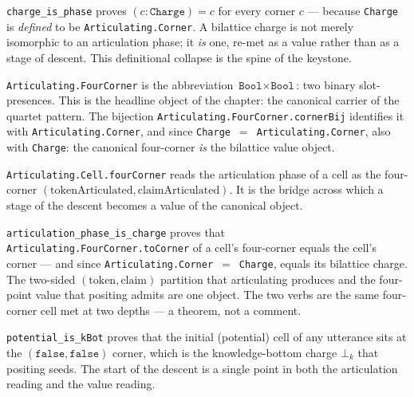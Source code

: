 \begin{theorem}\label{thm:charge-is-phase}\leanok{}
\texttt{charge\_is\_phase} proves $(c : \texttt{Charge}) = c$ for every corner $c$ --- because \texttt{Charge} is \emph{defined} to be \texttt{Articulating.Corner}. A bilattice charge is not merely isomorphic to an articulation phase; it \emph{is} one, re-met as a value rather than as a stage of descent. This definitional collapse is the spine of the keystone.
\end{theorem}
\begin{proposition}\label{thm:four-object}\leanok{}
\texttt{Articulating.FourCorner} is the abbreviation $\texttt{Bool} \times \texttt{Bool}$: two binary slot-presences. This is the headline object of the chapter: the canonical carrier of the quartet pattern. The bijection \texttt{Articulating.FourCorner.cornerBij} identifies it with \texttt{Articulating.Corner}, and since \texttt{Charge}~$=$~\texttt{Articulating.Corner}, also with \texttt{Charge}: the canonical four-corner \emph{is} the bilattice value object.
\end{proposition}
\begin{proposition}\label{thm:cell-fourcorner}\leanok{}
\texttt{Articulating.Cell.fourCorner} reads the articulation phase of a cell as the four-corner $(\text{tokenArticulated}, \text{claimArticulated})$. It is the bridge across which a stage of the descent becomes a value of the canonical object.
\end{proposition}
\begin{theorem}\label{thm:articulation-phase-is-charge}\leanok{}
\texttt{articulation\_phase\_is\_charge} proves that \texttt{Articulating.FourCorner.toCorner} of a cell's four-corner equals the cell's corner --- and since \texttt{Articulating.Corner}~$=$~\texttt{Charge}, equals its bilattice charge. The two-sided $(\text{token}, \text{claim})$ partition that articulating produces and the four-point value that positing admits are one object. The two verbs are the same four-corner cell met at two depths --- a theorem, not a comment.
\end{theorem}
\begin{theorem}\label{thm:potential-is-kbot}\leanok{}
\texttt{potential\_is\_kBot} proves that the initial (potential) cell of any utterance sits at the $(\texttt{false}, \texttt{false})$ corner, which is the knowledge-bottom charge $\bot_k$ that positing seeds. The start of the descent is a single point in both the articulation reading and the value reading.
\end{theorem}
